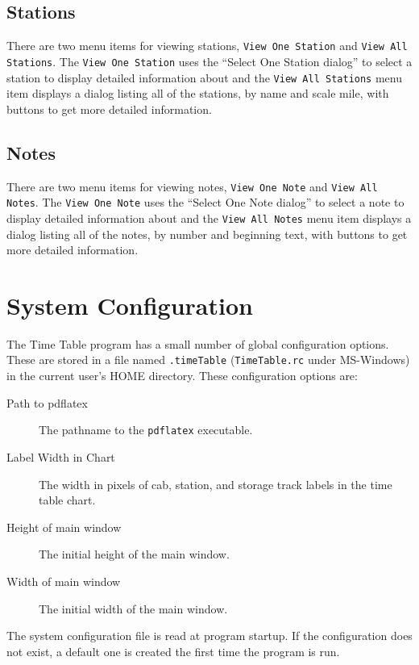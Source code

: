 \subsection{Stations}
\label{sect:tt:ViewingStations}

There are two menu items for viewing stations, \texttt{View One
Station} and \texttt{View All Stations}.  The \texttt{View One Station}
uses the ``Select One Station dialog'' to select a station to display
detailed information about and the \texttt{View All Stations} menu item
displays a dialog listing all of the stations, by name and scale mile, with
buttons to get more detailed information.

\subsection{Notes}
\label{sect:tt:ViewingNotes}

There are two menu items for viewing notes, \texttt{View One Note} and
\texttt{View All Notes}.  The \texttt{View One Note} uses the ``Select
One Note dialog'' to select a note to display detailed information
about and the \texttt{View All Notes} menu item displays a dialog
listing all of the notes, by number and beginning text, with buttons to
get more detailed information.

\section{System Configuration}

The Time Table program has a small number of global
configuration options.  These are stored in a file named
\texttt{.timeTable} (\texttt{TimeTable.rc} under MS-Windows) in the
current user's HOME directory.  These configuration options are:
\begin{description}
\item [Path to pdflatex] The pathname to the \texttt{pdflatex}
executable.
\item [Label Width in Chart] The width in pixels of cab, station, and
storage track labels in the time table chart.
\item [Height of main window] The initial height of the main window.
\item [Width of main window] The initial width of the main window.
\end{description}

The system configuration file is read at program startup.  If the
configuration does not exist, a default one is created the first time
the program is run.


